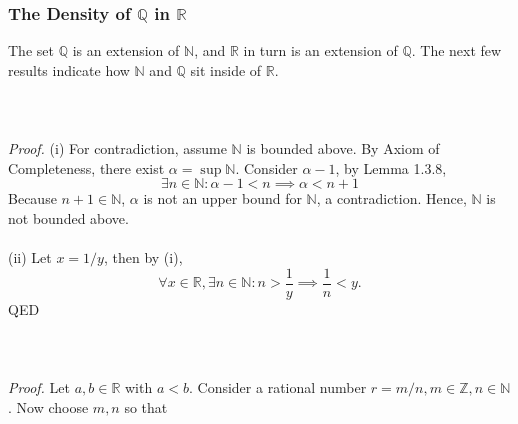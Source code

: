 \documentclass{article}
\begin{document}
    \subsubsection{The Density of $\mathbb{Q}$ in $\mathbb{R}$}
        The set $\mathbb{Q}$ is an extension of $\mathbb{N}$, and $\mathbb{R}$ in turn is an extension of $\mathbb{Q}$. The next few results indicate how $\mathbb{N}$ and $\mathbb{Q}$ sit inside of $\mathbb{R}$.
        \\ \\
        \\ \\
        \textit{Proof.} (i) For contradiction, assume $\mathbb{N}$ is bounded above. By Axiom of Completeness, there exist $\alpha = \sup \mathbb{N}$. Consider $\alpha -1$, by Lemma 1.3.8,
        \begin{equation*}
            \exists n \in \mathbb{N}: \alpha - 1 < n \implies \alpha < n + 1
        \end{equation*}
        Because $n+1 \in \mathbb{N}$, $\alpha$ is not an upper bound for $\mathbb{N}$, a contradiction. Hence, $\mathbb{N}$ is not bounded above.
        \\ \\
        (ii) Let $x=1/y$, then by (i), 
        \begin{equation*}
           \forall x \in \mathbb{R}, \exists n \in \mathbb{N}: n > \frac{1}{y} \implies \frac{1}{n} < y.
        \end{equation*}
        QED
        \\ \\
        \\ \\
        \textit{Proof.} Let $a,b \in \mathbb{R}$ with $a < b$. Consider a rational number $r = m/n,m \in \mathbb{Z},n\in \mathbb{N}$. Now choose $m,n$ so that 
\end{document}
